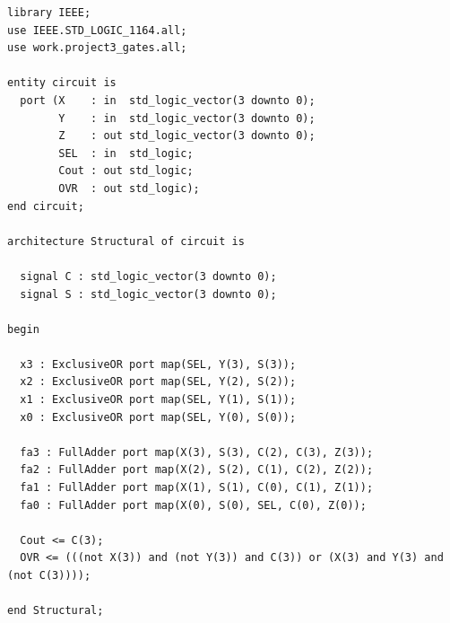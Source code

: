 \documentclass{article}
\begin{document}
\begin{verbatim}
library IEEE;
use IEEE.STD_LOGIC_1164.all;
use work.project3_gates.all;

entity circuit is
  port (X    : in  std_logic_vector(3 downto 0);
        Y    : in  std_logic_vector(3 downto 0);
        Z    : out std_logic_vector(3 downto 0);
        SEL  : in  std_logic;
        Cout : out std_logic;
        OVR  : out std_logic);
end circuit;

architecture Structural of circuit is

  signal C : std_logic_vector(3 downto 0);
  signal S : std_logic_vector(3 downto 0);

begin

  x3 : ExclusiveOR port map(SEL, Y(3), S(3));
  x2 : ExclusiveOR port map(SEL, Y(2), S(2));
  x1 : ExclusiveOR port map(SEL, Y(1), S(1));
  x0 : ExclusiveOR port map(SEL, Y(0), S(0));

  fa3 : FullAdder port map(X(3), S(3), C(2), C(3), Z(3));
  fa2 : FullAdder port map(X(2), S(2), C(1), C(2), Z(2));
  fa1 : FullAdder port map(X(1), S(1), C(0), C(1), Z(1));
  fa0 : FullAdder port map(X(0), S(0), SEL, C(0), Z(0));

  Cout <= C(3);
  OVR <= (((not X(3)) and (not Y(3)) and C(3)) or (X(3) and Y(3) and (not C(3))));

end Structural;
\end{verbatim}
\end{document}
